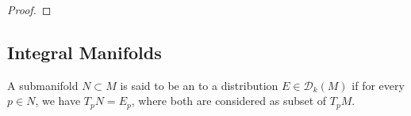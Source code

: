 \documentclass{lkx_paper}
\begin{document}
\begin{proof}
\end{proof}
%
%
%

\subsection{Integral Manifolds}

\begin{definition}
	A submanifold $N\subset M$ is said to be an  to a distribution $E\in \mathscr{D}_k(M)$ if for every $p\in N$, we have $T_p N = E_p$, where both are considered as subset of $T_p M$.
\end{definition}
\end{document}
